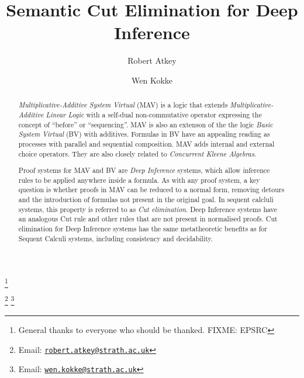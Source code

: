 \documentclass[twoside,11pt]{entics}
\begin{document}
\begin{frontmatter}
  \title{Semantic Cut Elimination for Deep Inference}
  \thanks[ALL]{General thanks to everyone who should be thanked. FIXME: EPSRC}
  \author{Robert Atkey}
  \author{Wen Kokke}
  \address[msp]{%
    Mathematically Structured Programming\\
    Computer and Information Sciences\\
    University of Strathclyde\\
    Glasgow, Scotland, UK}
  \thanks[bobemail]%
  {Email: \href{robert.atkey@strath.ac.uk}%
    {\texttt{\normalshape robert.atkey@strath.ac.uk}}}
  \thanks[wenemail]%
  {Email: \href{wen.kokke@strath.ac.uk}%
    {\texttt{\normalshape wen.kokke@strath.ac.uk}}}
  \begin{abstract}
    \emph{Multiplicative-Additive System Virtual} (MAV) is a logic
    that extends \emph{Multiplicative-Additive Linear Logic} with a
    self-dual non-commutative operator expressing the concept of
    ``before'' or ``sequencing''. MAV is also an extenson of the the
    logic \emph{Basic System Virtual} (BV) with additives. Formulas in
    BV have an appealing reading as processes with parallel and
    sequential composition. MAV adds internal and external choice
    operators. They are also closely related to \emph{Concurrent
      Kleene Algebras}.

    \medskip

    Proof systems for MAV and BV
    are \emph{Deep Inference} systems, which allow inference rules to
    be applied anywhere inside a formula.
    As with any proof system, a key question is whether proofs in MAV
    can be reduced to a normal form, removing detours and the
    introduction of formulas not present in the original goal. In
    sequent calcluli systems, this property is referred to as
    \emph{Cut elimination}. Deep Inference systems have an analogous
    Cut rule and other rules that are not present in normalised
    proofs. Cut elimination for Deep Inference systems has the same
    metatheoretic benefits as for Sequent Calculi systems, including
    consistency and decidability.


\end{abstract}
\end{frontmatter}
\end{document}
